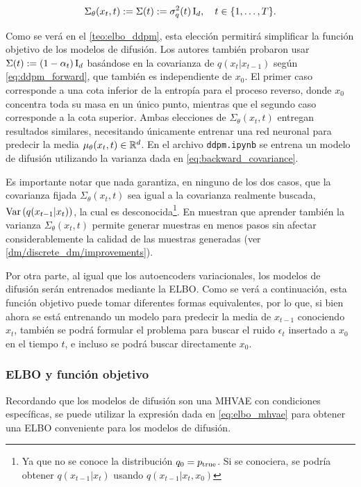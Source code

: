 \begin{equation}
    \label{eq:backward_covariance}
    \Sigma_\theta(x_t,t):=\Sigma(t):=\sigma_q^2(t)\operatorname{I}_{d},
    \quad t\in\{1,\ldots,T\}.
\end{equation}

Como se verá en el \autoref{teo:elbo_ddpm}, esta elección permitirá simplificar la función objetivo de los modelos de difusión. Los autores también probaron usar $\Sigma(t):=(1-\alpha_{t})\operatorname{I}_{d}$ basándose en la covarianza de $q(x_{t}|x_{t-1})$ según \eqref{eq:ddpm_forward}, que también es independiente de $x_0$. El primer caso corresponde a una cota inferior de la entropía para el proceso reverso, donde $x_0$ concentra toda su masa en un único punto, mientras que el segundo caso corresponde a la cota superior. Ambas elecciones de $\Sigma_\theta(x_t,t)$ entregan resultados similares, necesitando únicamente entrenar una red neuronal para predecir la media $\mu_\theta(x_t,t)\in\mathbb{R}^d$. En el archivo \texttt{ddpm.ipynb} se entrena un modelo de difusión utilizando la varianza dada en \eqref{eq:backward_covariance}.

Es importante notar que nada garantiza, en ninguno de los dos casos, que la covarianza fijada $\Sigma_\theta(x_t,t)$ sea igual a la covarianza realmente buscada, $\operatorname{Var}\left(q(x_{t-1}|x_t)\right)$, la cual es desconocida\footnote{Ya que no se conoce la distribución $q_0=p_{\operatorname{true}}$. Si se conociera, se podría obtener $q(x_{t-1}|x_t)$ usando $q(x_{t-1}|x_t,x_0)$}. En \cite{nichol2021improved} muestran que aprender también la varianza $\Sigma_\theta(x_t,t)$ permite generar muestras en menos pasos sin afectar considerablemente la calidad de las muestras generadas (ver \autoref{dm/discrete_dm/improvements}).

Por otra parte, al igual que los autoencoders variacionales, los modelos de difusión serán entrenados mediante la ELBO. Como se verá a continuación, esta función objetivo puede tomar diferentes formas equivalentes, por lo que, si bien ahora se está entrenando un modelo para predecir la media de $x_{t-1}$ conociendo $x_t$, también se podrá formular el problema para buscar el ruido $\epsilon_t$ insertado a $x_0$ en el tiempo $t$, e incluso se podrá buscar directamente $x_0$.

\subsubsection{ELBO y función objetivo}

Recordando que los modelos de difusión son una MHVAE con condiciones específicas, se puede utilizar la expresión dada en \eqref{eq:elbo_mhvae} para obtener una ELBO conveniente para los modelos de difusión.

